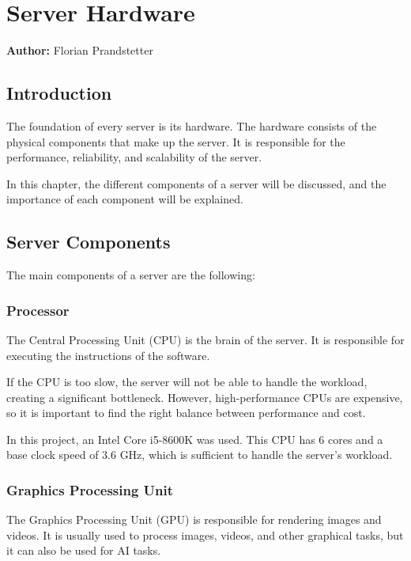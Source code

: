 \chapter{Server Hardware}
\label{chap:Server_Hardware}
\textbf{Author:} Florian Prandstetter

\section{Introduction}

The foundation of every server is its hardware. The hardware consists of the physical components that make up the server.
It is responsible for the performance, reliability, and scalability of the server.

In this chapter, the different components of a server will be discussed, and the importance of each component will be explained.

\section{Server Components}

The main components of a server are the following:

\subsection{Processor}

The Central Processing Unit (CPU) is the brain of the server. It is responsible for executing the instructions of the software. 

If the CPU is too slow, the server will not be able to handle the workload, creating a significant bottleneck. However, high-performance CPUs are expensive, so it is important to find the right balance between performance and cost.

In this project, an Intel Core i5-8600K was used. This CPU has 6 cores and a base clock speed of 3.6 GHz, which is sufficient to handle the server's workload.

\cite{CPU}
\cite{i5}

\subsection{Graphics Processing Unit}

The Graphics Processing Unit (GPU) is responsible for rendering images and videos. It is usually used to process images, videos, and other graphical tasks, but it can also be used for AI tasks.

